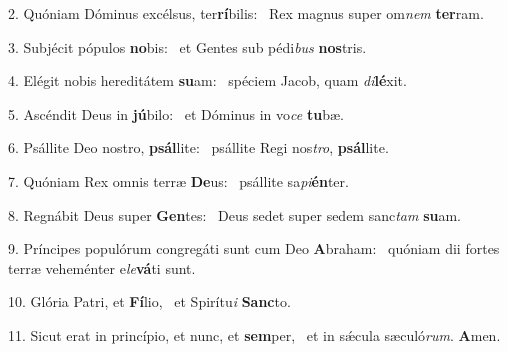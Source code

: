 2. Quóniam Dóminus excélsus, ter\textbf{rí}bilis: \ast\  Rex magnus super om\textit{nem} \textbf{ter}ram.\

3. Subjécit pópulos \textbf{no}bis: \ast\  et Gentes sub pédi\textit{bus} \textbf{nos}tris.\

4. Elégit nobis hereditátem \textbf{su}am: \ast\  spéciem Jacob, quam \textit{di}\textbf{lé}xit.\

5. Ascéndit Deus in \textbf{jú}bilo: \ast\  et Dóminus in vo\textit{ce} \textbf{tu}bæ.\

6. Psállite Deo nostro, \textbf{psál}lite: \ast\  psállite Regi nos\textit{tro}, \textbf{psál}lite.\

7. Quóniam Rex omnis terræ \textbf{De}us: \ast\  psállite sa\textit{pi}\textbf{én}ter.\

8. Regnábit Deus super \textbf{Gen}tes: \ast\  Deus sedet super sedem sanc\textit{tam} \textbf{su}am.\

9. Príncipes populórum congregáti sunt cum Deo \textbf{A}braham: \ast\  quóniam dii fortes terræ veheménter e\textit{le}\textbf{vá}ti sunt.\

10. Glória Patri, et \textbf{Fí}lio, \ast\  et Spirítu\textit{i} \textbf{Sanc}to.\

11. Sicut erat in princípio, et nunc, et \textbf{sem}per, \ast\  et in sǽcula sæculó\textit{rum}. \textbf{A}men.\

